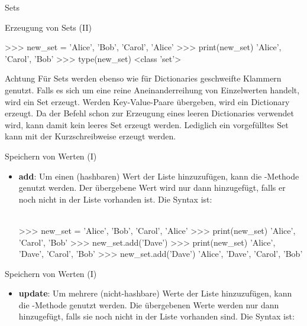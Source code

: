 \begin{subsection}{Sets}
\begin{frame}[fragile]{Erzeugung von Sets (II)}
\begin{itemize}
\begin{pyconcode}
>>> new_set = {'Alice', 'Bob', 'Carol', 'Alice'}
>>> print(new_set)
{'Alice', 'Carol', 'Bob'}
>>> type(new_set)
<class 'set'>
\end{pyconcode} 
            
                \begin{alertblock}{Achtung}
                    Für Sets werden ebenso wie für Dictionaries geschweifte Klammern genutzt. Falls es sich um eine reine Aneinanderreihung von Einzelwerten handelt, wird ein Set erzeugt. Werden Key-Value-Paare übergeben, wird ein Dictionary erzeugt. Da der Befehl \code{\{ \}} schon zur Erzeugung eines leeren Dictionaries verwendet wird, kann damit kein leeres Set erzeugt werden. Lediglich ein vorgefülltes Set kann mit der Kurzschreibweise erzeugt werden.
                \end{alertblock}

            \end{itemize}
            
        \end{frame}
        
        \begin{frame}[fragile]{Speichern von Werten (I)}
     
            \begin{itemize}
                \item \textbf{add}: Um einen (hashbaren) Wert der Liste hinzuzufügen, kann die -Methode genutzt werden. Der übergebene Wert wird nur dann hinzugefügt, falls er noch nicht in der Liste vorhanden ist. Die Syntax ist: \\~\
                
                
\begin{pyconcode}
>>> new_set = {'Alice', 'Bob', 'Carol', 'Alice'}
>>> print(new_set)
{'Alice', 'Carol', 'Bob'}
>>> new_set.add('Dave')
>>> print(new_set)
{'Alice', 'Dave', 'Carol', 'Bob'}
>>> new_set.add('Dave')
{'Alice', 'Dave', 'Carol', 'Bob'}
\end{pyconcode} 
            
            \end{itemize}
            
        \end{frame}
        
        \begin{frame}[fragile]{Speichern von Werten (I)}
            \begin{itemize}
                    \item \textbf{update}: Um mehrere (nicht-hashbare) Werte der Liste hinzuzufügen, kann die -Methode genutzt werden. Die übergebenen Werte werden nur dann hinzugefügt, falls sie noch nicht in der Liste vorhanden sind. Die Syntax ist: \\~\
                    

\end{itemize}
\end{frame}
\end{subsection}
